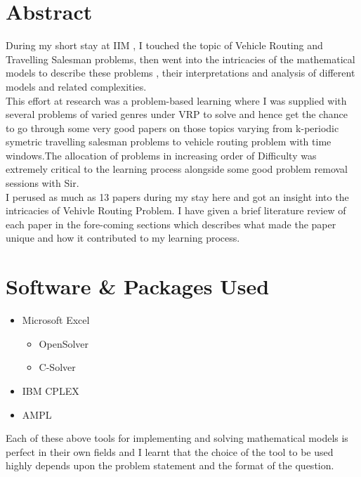 \documentclass[11pt,fleqn]{book} %
\begin{document}
\section{Abstract}
During my short stay at IIM , I touched the topic of Vehicle Routing and Travelling Salesman problems, then went into the intricacies of the mathematical models to describe these problems , their interpretations and analysis of different models and related complexities.
\vspace{.35cm}
\\This effort at research was a problem-based learning where I was supplied with several problems of varied genres under VRP to solve and hence get the chance to go through some very good papers on those topics varying from k-periodic symetric travelling salesman problems to vehicle routing problem with time windows.The allocation of problems in increasing order of Difficulty was extremely critical to the learning process alongside some good problem removal sessions with Sir. 
\vspace{.35cm}
\\I perused as much as 13 papers during my stay here and got an insight into the intricacies of Vehivle Routing Problem. I have given a brief literature review of each paper in the fore-coming sections which describes what made the paper unique and how it contributed to my learning process.

\newpage

\section{Software \& Packages Used}

\begin{itemize}
\item Microsoft Excel
\begin{itemize}
\item OpenSolver
\item C-Solver
\end{itemize}
\item IBM CPLEX
\item AMPL
\end{itemize}

Each of these above tools for implementing and solving mathematical models is perfect in their own fields and I learnt that the choice of the tool to be used highly depends upon the problem statement and the format of the question.
\end{document}
